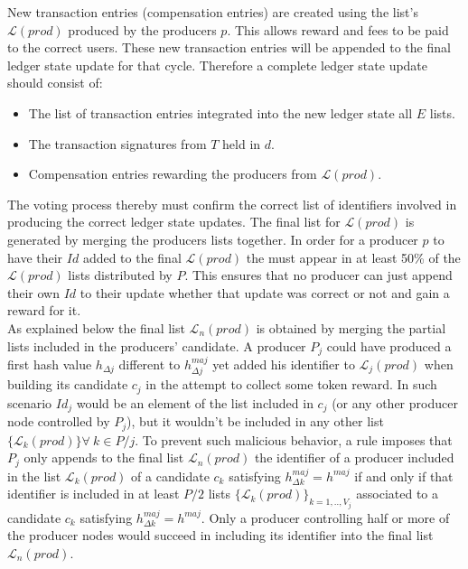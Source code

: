 \documentclass{article}
\begin{document}
New transaction entries (compensation entries) are created using the list's  $\mathcal{L}(prod)$ produced by the producers $p$. This allows reward and fees to be paid to the correct users. These new transaction entries will be appended to the final ledger state update for that cycle. Therefore a complete ledger state update should consist of: 

\begin{itemize}
\item The list of transaction entries integrated into the new ledger state all $E$ lists. 
\item The transaction signatures from $T$ held in $d$. 
\item Compensation entries rewarding the producers from $\mathcal{L}(prod)$. 

\end{itemize}

The voting process thereby must confirm the correct list of identifiers involved in producing the correct ledger state updates. The final list for  $\mathcal{L}(prod)$ is generated by merging the producers lists together. In order for a producer $p$ to have their $Id$ added to the final  $\mathcal{L}(prod)$ the must appear in at least 50\% of the  $\mathcal{L}(prod)$ lists distributed by $P$. This ensures that no producer can just append their own $Id$ to their update whether that update was correct or not and gain a reward for it.  \\

As explained below the final list $\mathcal{L}_n(prod)$ is obtained by merging the partial lists included in the producers' candidate. A producer $P_j$ could have produced a first hash value $h_{\Delta j}$ different to $h^{maj}_{\Delta j}$ yet added his identifier to $\mathcal{L}_j(prod)$ when building its candidate $c_j$ in the attempt to collect some token reward. In such scenario $Id_j$ would be an element of the list included in $c_j$ (or any other producer node controlled by $P_j$), but it wouldn't be included in any other list $\{\mathcal{L}_k(prod)\} \forall~k \in P/j$. To prevent such malicious behavior, a rule imposes that $P_j$ only appends to the final list $\mathcal{L}_n(prod)$ the identifier of a producer included in the list $\mathcal{L}_k(prod)$ of a candidate $c_k$ satisfying $h^{maj}_{\Delta k} = h^{maj}$ if and only if that identifier is included in at least $P/2$ lists $\{\mathcal{L}_{k}(prod)\}_{k=1,..,V_j}$ associated to a candidate $c_{k}$ satisfying $h^{maj}_{\Delta k} = h^{maj}$. Only a producer controlling half or more of the producer nodes would succeed in including its identifier into the final list $\mathcal{L}_n(prod)$.\\
\end{document}

